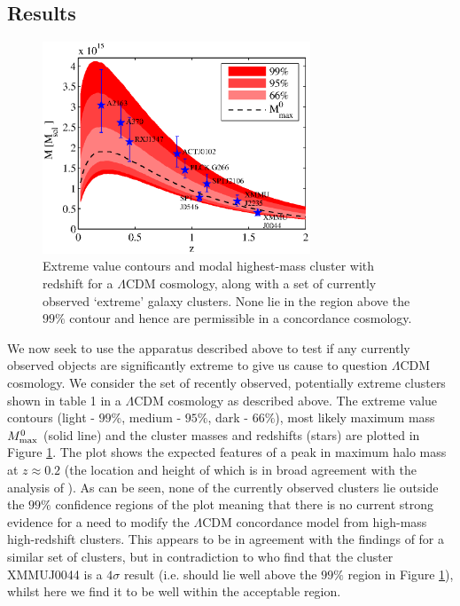 \documentclass[twocolumn,useAMS,usenatbib,usegraphicx]{mn2e}
\newcommand{\lcdm}{$\Lambda$CDM }
\begin{document}
\subsection{Results}
\begin{figure}
 \begin{centering}
  \includegraphics[width=80mm]{mz.eps}
 \caption{Extreme value contours and modal highest-mass cluster with redshift for a \lcdm cosmology, along with a set of currently observed `extreme' galaxy clusters. None lie in the region above the $99\%$ contour and hence are permissible in a concordance cosmology.}
    \label{fig:mmaxz}
 \end{centering}
\end{figure}
We now seek to use the apparatus described above to test if any
currently observed objects are significantly extreme to give us
cause to question \lcdm cosmology. We consider the set of recently
observed, potentially extreme clusters shown in table 1 in a \lcdm
cosmology as described above. The extreme value contours (light -
$99\%$, medium - $95\%$, dark - $66\%$), most likely maximum mass ${M}^{0}_{\rm max}$
(solid line) and the cluster masses and redshifts (stars) are
plotted in Figure \ref{fig:mmaxz}. The plot shows the expected
features of a peak in maximum halo mass at $z\approx0.2$ (the
location and height of which is in broad agreement with the analysis
of \citealt{Holz2010}). As can be seen, none of the currently
observed clusters lie outside the $99\%$ confidence regions of the
plot meaning that there is no current strong evidence for a need to
modify the \lcdm concordance model from high-mass high-redshift
clusters. This appears to be in agreement with the findings of
\cite{Waizmann2011a} for a similar set of clusters, but in
contradiction to \cite{Chongchitnan2011} who find that the cluster
XMMUJ0044 is a $4\sigma$ result (i.e. should lie well above the
$99\%$ region in Figure \ref{fig:mmaxz}), whilst here we find it to
be well within the acceptable region.
\end{document}
